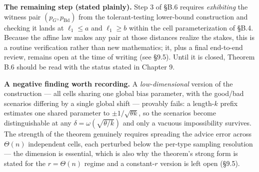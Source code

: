 \textbf{The remaining step (stated plainly).} Step 3 of §B.6 requires
\emph{exhibiting} the witness pair \((p_G,p_{\mathrm{Bd}})\) from the
tolerant-testing lower-bound construction and checking it lands at
\(\ell_1\le a\) and \(\ell_1\ge b\) within the cell parameterization of
§B.4. Because the affine law makes any pair at those distances realize
the stakes, this is a routine verification rather than new mathematics;
it, plus a final end-to-end review, remains open at the time of writing
(see §9.5). Until it is closed, Theorem B.6 should be read with the
status stated in Chapter 9.

\textbf{A negative finding worth recording.} A \emph{low-dimensional}
version of the construction --- all cells sharing one global bias
parameter, with the good/bad scenarios differing by a single global
shift --- provably fails: a length-\(k\) prefix estimates one shared
parameter to \(\pm1/\sqrt{\theta k}\), so the scenarios become
distinguishable at any \(\delta=\omega(\sqrt{\theta/k})\) and only a
vacuous impossibility survives. The strength of the theorem genuinely
requires spreading the advice error across \(\Theta(n)\) independent
cells, each perturbed below the per-type sampling resolution --- the
dimension is essential, which is also why the theorem's strong form is
stated for the \(r=\Theta(n)\) regime and a constant-\(r\) version is
left open (§9.5).
